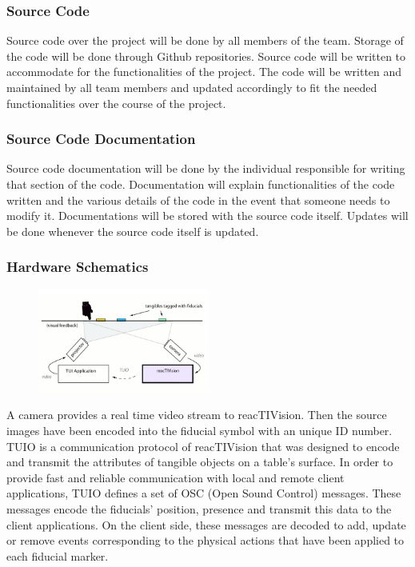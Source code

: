 \subsubsection{Source Code}
Source code over the project will be done by all members of the team. Storage of the code will be done through Github repositories. Source code will be written to accommodate for the functionalities of the project. The code will be written and maintained by all team members and updated accordingly to fit the needed functionalities over the course of the project. 

\subsubsection{Source Code Documentation}
Source code documentation will be done by the individual responsible for writing that section of the code. Documentation will explain functionalities of the code written and the various details of the code in the event that someone needs to modify it. Documentations will be stored with the source code itself. Updates will be done whenever the source code itself is updated. 

\subsubsection{Hardware Schematics}
\begin{figure}[h!]
    \centering
    \includegraphics[width=0.5\textwidth]{images/Diagram.jpg}
\end{figure}
A camera provides a real time video stream to reacTIVision. Then the source images have been encoded into the fiducial symbol with an unique ID number. TUIO is a communication protocol of reacTIVision that was designed to encode and transmit the attributes of tangible objects on a table's surface. In order to provide fast and reliable communication with local and remote client applications, TUIO defines a set of OSC (Open Sound Control) messages. These messages encode the fiducials' position, presence and transmit this data to the client applications. On the client side, these messages are decoded to add, update or remove events corresponding to the physical actions that have been applied to each fiducial marker.

